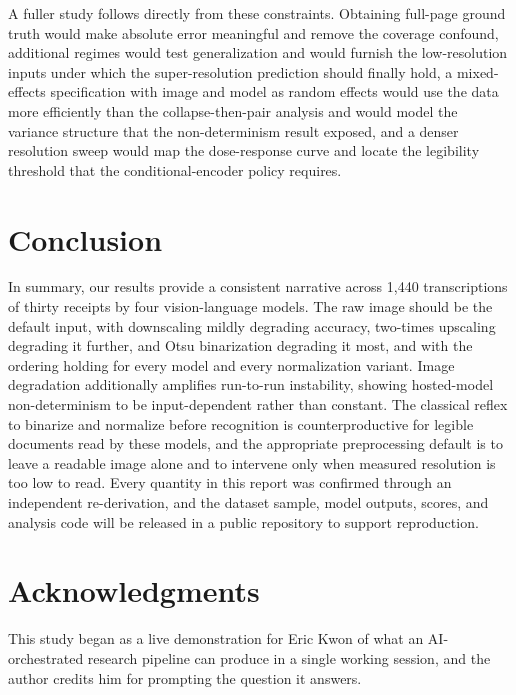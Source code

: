 \documentclass[11pt]{article}
\begin{document}
A fuller study follows directly from these constraints. Obtaining full-page ground truth would make
absolute error meaningful and remove the coverage confound, additional regimes would test
generalization and would furnish the low-resolution inputs under which the super-resolution
prediction should finally hold, a mixed-effects specification with image and model as random effects
would use the data more efficiently than the collapse-then-pair analysis and would model the
variance structure that the non-determinism result exposed, and a denser resolution sweep would map
the dose-response curve and locate the legibility threshold that the conditional-encoder policy
requires.

\section{Conclusion}

In summary, our results provide a consistent narrative across 1{,}440 transcriptions of thirty
receipts by four vision-language models. The raw image should be the default input, with downscaling
mildly degrading accuracy, two-times upscaling degrading it further, and Otsu binarization degrading
it most, and with the ordering holding for every model and every normalization variant. Image
degradation additionally amplifies run-to-run instability, showing hosted-model non-determinism to
be input-dependent rather than constant. The classical reflex to binarize and normalize before
recognition is counterproductive for legible documents read by these models, and the appropriate
preprocessing default is to leave a readable image alone and to intervene only when measured
resolution is too low to read. Every quantity in this report was confirmed through an independent
re-derivation, and the dataset sample, model outputs, scores, and analysis code will be released
in a public repository to support reproduction.

\section*{Acknowledgments}

This study began as a live demonstration for Eric Kwon of what an AI-orchestrated research
pipeline can produce in a single working session, and the author credits him for prompting
the question it answers.



\end{document}
